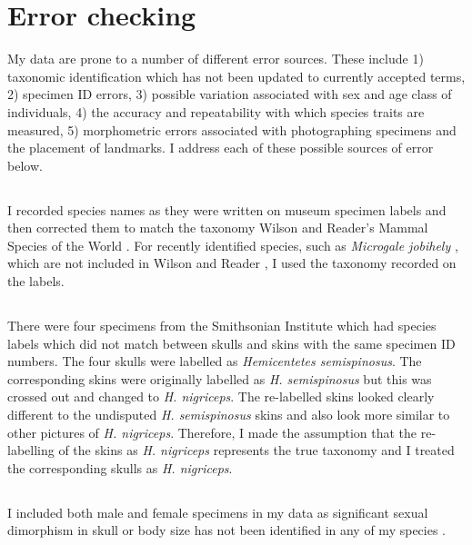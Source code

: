\section{Error checking}
My data are prone to a number of different error sources. These include 1) taxonomic identification which has not been updated to currently accepted terms, 2) specimen ID errors, 3) possible variation associated with sex and age class of individuals, 4) the accuracy and repeatability with which species traits are measured, 5) morphometric errors associated with photographing specimens and the placement of landmarks. I address each of these possible sources of error below.  

\subsection{}
I recorded species names as they were written on museum specimen labels and then corrected them to match the taxonomy Wilson and Reader’s Mammal Species of the World \citeyearpar{Wilson2005}. For recently identified species, such as \textit{Microgale jobihely} \citep{Goodman2006}, which are not included in Wilson and Reader \citeyearpar{Wilson2005}, I used the taxonomy recorded on the labels. 

\subsection{}
	
There were four specimens from the Smithsonian Institute which had species labels which did not match between skulls and skins with the same specimen ID numbers. The four skulls were labelled as \textit{Hemicentetes semispinosus}. The corresponding skins were originally labelled as \textit{H. semispinosus} but this was crossed out and changed to \textit{H. nigriceps}. The re-labelled skins looked clearly different to the undisputed \textit{H. semispinosus} skins and also look more similar to other pictures of \textit{H. nigriceps}. Therefore, I made the assumption that the re-labelling of the skins as \textit{H. nigriceps} represents the true taxonomy and I treated the corresponding skulls as \textit{H. nigriceps}.

\subsection{}
I included both male and female specimens in my data as significant sexual dimorphism in skull or body size has not been identified in any of my species \citep[NEED MORE REFERENCES][]{Olson2004}.


